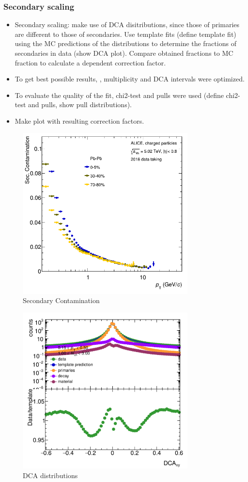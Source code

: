 \documentclass[12pt,a4paper]{report}
\begin{document}
\subsubsection{Secondary scaling} 
\begin{itemize}
\item Secondary scaling: make use of DCA disitributions, since those of primaries are different to those of secondaries. Use template fits (define template fit) using the MC predictions of the distributions to determine the fractions of secondaries in data (show DCA plot). Compare obtained fractions to MC fraction to calculate a \pt dependent correction factor. 
\item To get best possible results, \pt, multiplicity and DCA intervals were optimized.
\item To evaluate the quality of the fit, chi2-test and pulls were used (define chi2-test and pulls, show pull distributions).
\item Make plot with resulting correction factors. 
\end{itemize}
\begin{figure}[tb!]
\centering
\includegraphics[width=9cm]{Plots/SecCont.png}  
\caption{Secondary Contamination} 
\end{figure}
\begin{figure}[tb!]
\centering
\includegraphics[width=9cm]{Plots/DCAdistribution.png}  
\caption{DCA distributions} 
\end{figure}
\end{document}
